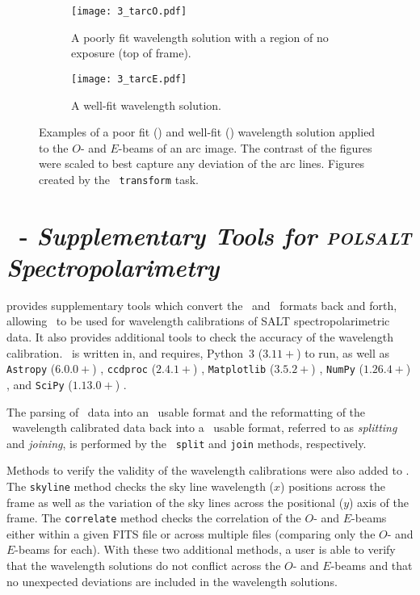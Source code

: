 \begin{figure}[t]
    \centering
    \begin{subfigure}[b]{1.0 \textwidth}
        \centering
        \texttt{[image: 3\_tarcO.pdf]}
        \caption{A poorly fit wavelength solution with a region of no exposure (top of frame).}
        \label{subfig:trans_O}
    \end{subfigure}
    \centering
    \begin{subfigure}[b]{1.0\textwidth}
        \centering
        \texttt{[image: 3\_tarcE.pdf]}
        \caption{A well-fit wavelength solution.}
        \label{subfig:trans_E}
    \end{subfigure}
    \caption{Examples of a poor fit () and well-fit () wavelength solution applied to the $O$- and $E$-beams of an arc image. The contrast of the figures were scaled to best capture any deviation of the arc lines. Figures created by the \iraf\ \texttt{transform} task.}
    \label{fig:iraf_trans_plot}
\end{figure}

\section[\textsc{stops}]{\stops\ - \textit{Supplementary Tools for \textsc{polsalt}\\Spectropolarimetry}} \label{sec:stops}

 provides supplementary tools which convert the \polsalt\ and \iraf\ formats back and forth, allowing \iraf\ to be used for wavelength calibrations of \gls{SALT} spectropolarimetric data. It also provides additional tools to check the accuracy of the wavelength calibration.
\stops\ is written in, and requires, Python~$3$ ($3.11+$) to run, as well as \texttt{Astropy} ($6.0.0+$) \citep{astropy:2013, astropy:2018, astropy:2022}, \texttt{ccdproc} ($2.4.1+$) \citep{ccdproc}, \texttt{Matplotlib} ($3.5.2+$) \citep{matplotlib}, \texttt{NumPy} ($1.26.4+$) \citep{numpy}, and \texttt{SciPy} ($1.13.0+$) \citep{scipy}.

The parsing of \polsalt\ data into an \iraf\ usable format and the reformatting of the \iraf\ wavelength calibrated data back into a \polsalt\ usable format, referred to as \textit{splitting} and \textit{joining}, is performed by the \stops\ \texttt{split} and \texttt{join} methods, respectively.

Methods to verify the validity of the wavelength calibrations were also added to \stops. The \texttt{skyline} method checks the sky line wavelength ($x$) positions across the frame as well as the variation of the sky lines across the positional ($y$) axis of the frame. The \texttt{correlate} method checks the correlation of the $O$- and $E$-beams either within a given \gls{FITS} file or across multiple files (comparing only the $O$- and $E$-beams for each). With these two additional methods, a user is able to verify that the wavelength solutions do not conflict across the $O$- and $E$-beams and that no unexpected deviations are included in the wavelength solutions.

